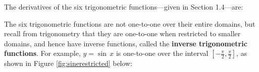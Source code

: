 \noindent The derivatives of the six trigonometric functions---given in Section
1.4---are:


The six trigonometric functions are not one-to-one over their entire domains,
but recall from trigonometry that they are one-to-one when restricted to smaller
domains, and hence have inverse functions, called the \textbf{inverse
trigonometric functions}.
\newpage
\noindent For example, $y = \sin\,x$ is one-to-one over the interval
$\left[ -\frac{\pi}{2},\frac{\pi}{2} \right]$, as shown in
Figure \ref{fig:sinerestricted} below:

